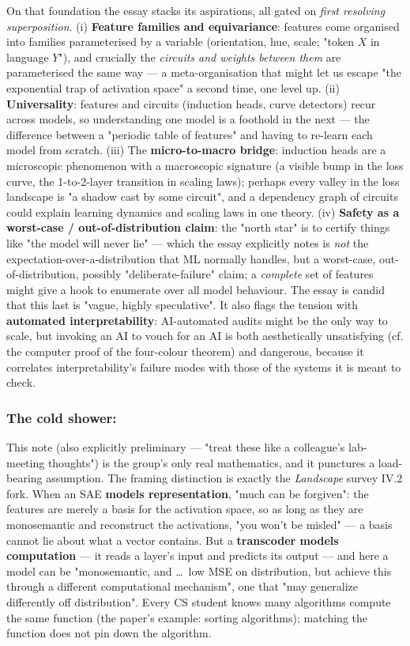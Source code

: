 On that foundation the essay stacks its aspirations, all gated on \emph{first resolving superposition}. (i) \textbf{Feature families and equivariance}: features come organised into families parameterised by a variable (orientation, hue, scale; "token $X$ in language $Y$"), and crucially the \emph{circuits and weights between them} are parameterised the same way --- a meta-organisation that might let us escape "the exponential trap of activation space" a second time, one level up. (ii) \textbf{Universality}: features and circuits (induction heads, curve detectors) recur across models, so understanding one model is a foothold in the next --- the difference between a "periodic table of features" and having to re-learn each model from scratch. (iii) The \textbf{micro-to-macro bridge}: induction heads are a microscopic phenomenon with a macroscopic signature (a visible bump in the loss curve, the 1-to-2-layer transition in scaling laws); perhaps every valley in the loss landscape is "a shadow cast by some circuit", and a dependency graph of circuits could explain learning dynamics and scaling laws in one theory. (iv) \textbf{Safety as a worst-case / out-of-distribution claim}: the "north star" is to certify things like "the model will never lie" --- which the essay explicitly notes is \emph{not} the expectation-over-a-distribution that ML normally handles, but a worst-case, out-of-distribution, possibly "deliberate-failure" claim; a \emph{complete} set of features might give a hook to enumerate over all model behaviour. The essay is candid that this last is "vague, highly speculative". It also flags the tension with \textbf{automated interpretability}: AI-automated audits might be the only way to scale, but invoking an AI to vouch for an AI is both aesthetically unsatisfying (cf. the computer proof of the four-colour theorem) and dangerous, because it correlates interpretability's failure modes with those of the systems it is meant to check.


\subsubsection*{The cold shower: \texorpdfstring{\textcite{toy-model-of-mechanistic-unfaithfulness}}{A Toy Model of Mechanistic (Un)Faithfulness}}

This note (also explicitly preliminary --- "treat these like a colleague's lab-meeting thoughts") is the group's only real mathematics, and it punctures a load-bearing assumption. The framing distinction is exactly the \emph{Landscape} survey IV.2 fork. When an SAE \textbf{models representation}, "much can be forgiven": the features are merely a basis for the activation space, so as long as they are monosemantic and reconstruct the activations, "you won't be misled" --- a basis cannot lie about what a vector contains. But a \textbf{transcoder models computation} --- it reads a layer's input and predicts its output --- and here a model can be "monosemantic, and \dots\ low MSE on distribution, but achieve this through a different computational mechanism", one that "may generalize differently off distribution". Every CS student knows many algorithms compute the same function (the paper's example: sorting algorithms); matching the function does not pin down the algorithm.

